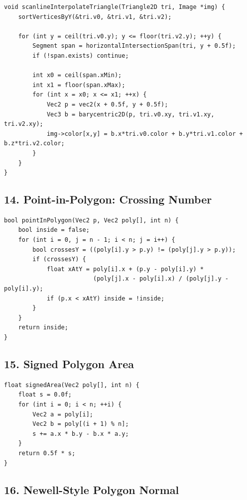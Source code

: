 \documentclass[10pt,letterpaper]{article}
\begin{document}
\begin{verbatim}
void scanlineInterpolateTriangle(Triangle2D tri, Image *img) {
    sortVerticesByY(&tri.v0, &tri.v1, &tri.v2);

    for (int y = ceil(tri.v0.y); y <= floor(tri.v2.y); ++y) {
        Segment span = horizontalIntersectionSpan(tri, y + 0.5f);
        if (!span.exists) continue;

        int x0 = ceil(span.xMin);
        int x1 = floor(span.xMax);
        for (int x = x0; x <= x1; ++x) {
            Vec2 p = vec2(x + 0.5f, y + 0.5f);
            Vec3 b = barycentric2D(p, tri.v0.xy, tri.v1.xy, tri.v2.xy);
            img->color[x,y] = b.x*tri.v0.color + b.y*tri.v1.color + b.z*tri.v2.color;
        }
    }
}
\end{verbatim}

\subsection{14. Point-in-Polygon: Crossing Number}

\begin{verbatim}
bool pointInPolygon(Vec2 p, Vec2 poly[], int n) {
    bool inside = false;
    for (int i = 0, j = n - 1; i < n; j = i++) {
        bool crossesY = ((poly[i].y > p.y) != (poly[j].y > p.y));
        if (crossesY) {
            float xAtY = poly[i].x + (p.y - poly[i].y) *
                         (poly[j].x - poly[i].x) / (poly[j].y - poly[i].y);
            if (p.x < xAtY) inside = !inside;
        }
    }
    return inside;
}
\end{verbatim}

\subsection{15. Signed Polygon Area}

\begin{verbatim}
float signedArea(Vec2 poly[], int n) {
    float s = 0.0f;
    for (int i = 0; i < n; ++i) {
        Vec2 a = poly[i];
        Vec2 b = poly[(i + 1) % n];
        s += a.x * b.y - b.x * a.y;
    }
    return 0.5f * s;
}
\end{verbatim}

\subsection{16. Newell-Style Polygon Normal}
\end{document}
